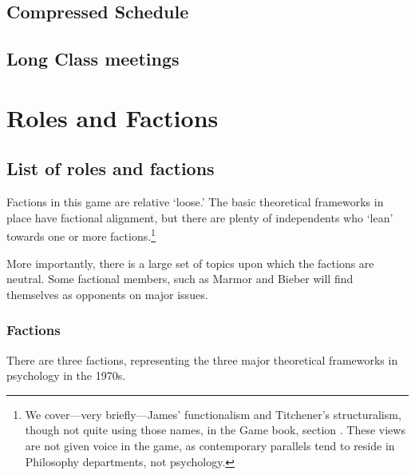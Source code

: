 \begin{refsection}
\section{Compressed Schedule}
\label{compressedschedule}

\section{Long Class meetings}
\label{longclassmeetings}

\pagebreak 

\chapter{Roles and Factions}
\label{rolesandfactions}

\section{List of roles and factions}
\label{listofrolesandfactions}

Factions in this game are relative `loose.' The basic theoretical frameworks in place have factional alignment, but there are plenty of independents who `lean' towards one or more factions.\footnote{We cover---very briefly---James’ functionalism and Titchener’s structuralism, though not quite using those names, in the Game book, section . These views are not given voice in the game, as contemporary parallels tend to reside in Philosophy departments, not psychology.}

More importantly, there is a large set of topics upon which the factions are neutral. Some factional members, such as Marmor and Bieber will find themselves as opponents on major issues.

\subsection{Factions}
\label{factions}

There are three factions, representing the three major theoretical frameworks in psychology in the 1970s.


\end{refsection}
